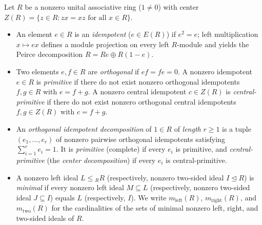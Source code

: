 \documentclass[11pt]{article}
\theoremstyle{definition}
\begin{document}
Let $R$ be a nonzero unital associative ring ($1 \neq 0$) with center
$Z(R) = \{z \in R : zx = xz \text{ for all } x \in R\}$.
\begin{itemize}
\item An element $e \in R$ is an \emph{idempotent} ($e \in E(R)$) if $e^2 = e$;
left multiplication $x \mapsto ex$ defines a module projection on every left
$R$-module and yields the Peirce decomposition $R = Re \oplus R(1-e)$.
\item Two elements $e, f \in R$ are \emph{orthogonal} if $ef = fe = 0$. A
nonzero idempotent $e \in R$ is \emph{primitive} if there do not exist nonzero
orthogonal idempotents $f, g \in R$ with $e = f + g$. A nonzero central
idempotent $c \in Z(R)$ is \emph{central-primitive} if there do not exist
nonzero orthogonal central idempotents $f, g \in Z(R)$ with $c = f + g$.
\item An \emph{orthogonal idempotent decomposition} of $1 \in R$ of
\emph{length} $r \ge 1$ is a tuple $(e_1, \dots, e_r)$ of nonzero pairwise
orthogonal idempotents satisfying $\sum_{i=1}^r e_i = 1$. It is \emph{primitive}
(complete) if every $e_i$ is primitive, and \emph{central-primitive} (the
\emph{center decomposition}) if every $e_i$ is central-primitive.
\item A nonzero left ideal $L \leq {}_R R$ (respectively, nonzero two-sided
ideal $I \trianglelefteq R$) is \emph{minimal} if every nonzero left ideal
$M \subseteq L$ (respectively, nonzero two-sided ideal $J \subseteq I$) equals
$L$ (respectively, $I$). We write $m_{\mathrm{left}}(R)$,
$m_{\mathrm{right}}(R)$, and $m_{\mathrm{two}}(R)$ for the cardinalities of the
sets of minimal nonzero left, right, and two-sided ideals of $R$.
\end{itemize}
\end{document}
